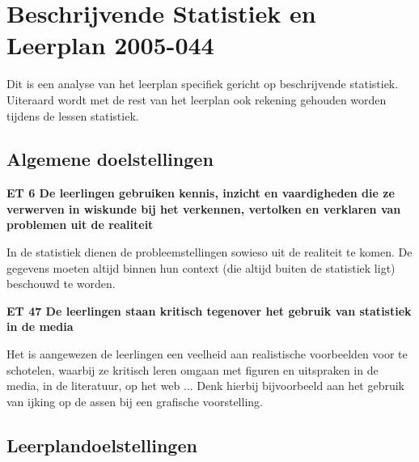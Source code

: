 \documentclass[11pt]{article}
\begin{document}
\section{Beschrijvende Statistiek en Leerplan 2005-044}

Dit is een analyse van het leerplan specifiek gericht op beschrijvende statistiek. Uiteraard wordt met de rest van het leerplan ook rekening gehouden worden tijdens de lessen statistiek.

\subsection{Algemene doelstellingen}

{\bf ET 6 De leerlingen gebruiken kennis, inzicht en vaardigheden die ze verwerven in wiskunde bij het verkennen, vertolken en verklaren van problemen uit de realiteit}

In de statistiek dienen de probleemstellingen sowieso uit de realiteit te komen. De gegevens moeten altijd binnen hun context (die altijd buiten de statistiek ligt) beschouwd te worden.


{\bf ET 47 De leerlingen staan kritisch tegenover het gebruik van statistiek in de media}

Het is aangewezen de leerlingen een veelheid aan realistische voorbeelden voor te schotelen, waarbij ze kritisch leren omgaan met figuren en uitspraken in de media, in de literatuur, op het web ... Denk hierbij
bijvoorbeeld aan het gebruik van ijking op de assen bij een grafische voorstelling.

\subsection{Leerplandoelstellingen}
\end{document}

